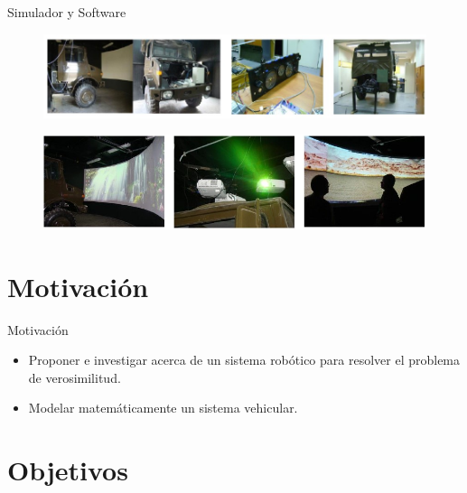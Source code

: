 \documentclass{beamer}
\begin{document}
\begin{frame}{Simulador y Software}

\begin{figure}[h]
\centering
\includegraphics[scale=0.4]{Unimog_1300}

\end{figure}

\begin{figure}[h]
\centering
\includegraphics[scale=0.4]{simulador_software}

\end{figure}


\vskip 1cm
\end{frame}



\section{Motivación}

\begin{frame}{Motivación}

\begin{itemize}
 \item Proponer e investigar acerca de un sistema robótico para resolver el problema de verosimilitud.
 \item Modelar matemáticamente un sistema vehicular.
\end{itemize}
\vskip 1cm
\end{frame}

\section{Objetivos}
\end{document}

